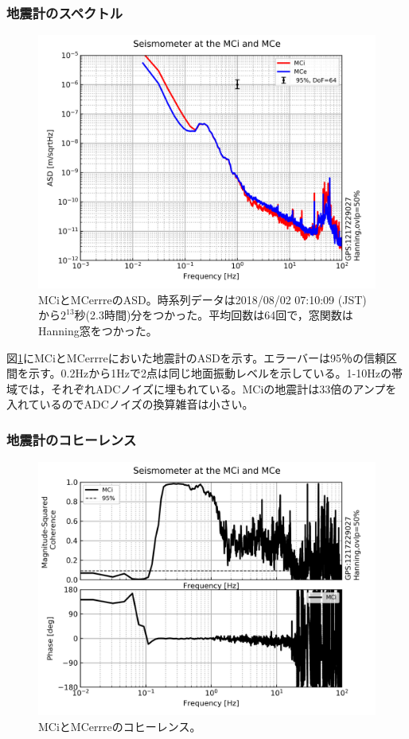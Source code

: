 \subsubsection{地震計のスペクトル}

\begin{figure}[H]
  \begin{center}
    \includegraphics[width=11.5cm]{./img_asd_mcimce.png}
  \end{center}
  \caption{MCiとMCerrreのASD。時系列データは2018/08/02 07:10:09 (JST)から$2^{13}$秒(2.3時間)分をつかった。平均回数は64回で，窓関数はHanning窓をつかった。}\label{img:img_asd_imc}
\end{figure}

図\ref{img:img_asd_imc}にMCiとMCerrreにおいた地震計のASDを示す。エラーバーは95％の信頼区間を示す。0.2Hzから1Hzで2点は同じ地面振動レベルを示している。1-10Hzの帯域では，それぞれADCノイズに埋もれている。MCiの地震計は33倍のアンプを入れているのでADCノイズの換算雑音は小さい。


\subsubsection{地震計のコヒーレンス}

\begin{figure}[H]
  \begin{center}
    \includegraphics[width=11.5cm]{./img_coh_mcimce.png}
  \end{center}
  \caption{MCiとMCerrreのコヒーレンス。}\label{img:img_coherence_imc}
\end{figure}

